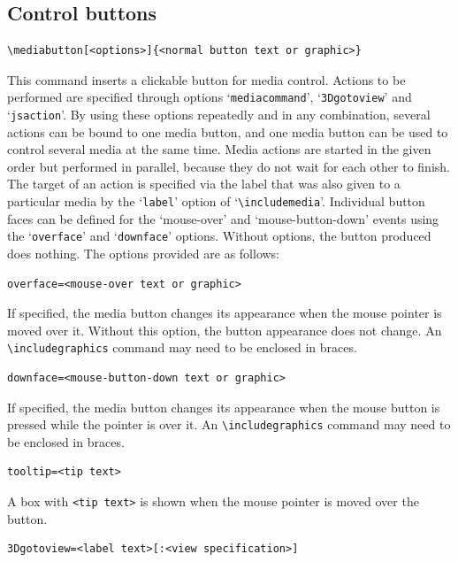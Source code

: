 \documentclass[a4paper]{article}
\begin{document}
\clearpage
\subsection{Control buttons}\label{mbtn}
\begin{verbatim}
\mediabutton[<options>]{<normal button text or graphic>}
\end{verbatim}
This command inserts a clickable button for media control. Actions to be performed are specified through options `\verb+mediacommand+', `\verb+3Dgotoview+' and `\verb+jsaction+'. By using these options repeatedly and in any combination, several actions can be bound to one media button, and one media button can be used to control several media at the same time. Media actions are started in the given order but performed in parallel, because they do not wait for each other to finish. The target of an action is specified via the label that was also given to a particular media by the `\verb+label+' option of `\verb+\includemedia+'. Individual button faces can be defined for the `mouse-over' and `mouse-button-down' events using the `\verb+overface+' and `\verb+downface+' options. Without options, the button produced does nothing. The options provided are as follows:
\begin{verbatim}
overface=<mouse-over text or graphic>
\end{verbatim}
If specified, the media button changes its appearance when the mouse pointer is moved over it. Without this option, the button appearance does not change. An \verb+\includegraphics+ command may need to be enclosed in braces.
\begin{verbatim}
downface=<mouse-button-down text or graphic>
\end{verbatim}
If specified, the media button changes its appearance when the mouse button is pressed while the pointer is over it. An \verb+\includegraphics+ command may need to be enclosed in braces.
\begin{verbatim}
tooltip=<tip text>
\end{verbatim}
A box with \verb+<tip text>+ is shown when the mouse pointer is moved over the button.
\begin{verbatim}
3Dgotoview=<label text>[:<view specification>]
\end{verbatim}
\end{document}
